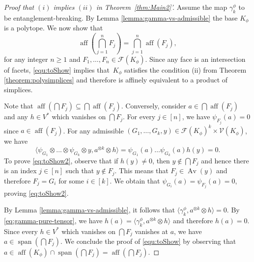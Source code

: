 \documentclass{amsart}
\renewcommand{\geq}{\geqslant}
\renewcommand{\subset}{\subseteq}
\DeclareMathOperator{\mathspan}{\mathrm{span}}
\DeclareMathOperator{\aff}{\mathrm{aff}}
\DeclareMathOperator{\Av}{Av}
\theoremstyle{plain}
\newcommand{\new}[1]{\textcolor{blue}{#1}}
\begin{document}
\begin{proof}[Proof that $(i)$ implies $(ii)$ in Theorem~\ref{thm:Main2}']
Assume the map $\gamma_k^\phi$ to be entanglement-breaking. 
By Lemma \ref{lemma:gamma-vs-admissible} the base $K_\phi$ is a polytope. We now show that
\begin{equation}\label{equ:toShow}
\aff \left( \bigcap_{j=1}^n F_j \right) = \bigcap_{j=1}^n \aff ( F_j),
\end{equation}
for any integer $n \geq 1$ and $F_1,\dots,F_n \in \mathcal{F}(K_\phi)$. Since any face is an intersection of facets, \eqref{equ:toShow} implies that~$K_\phi$ satisfies the condition (ii) from Theorem \ref{theorem:polysimplices} and therefore is affinely equivalent to a product of simplices.


Note that $\aff \left( \bigcap F_j \right) \subset \bigcap \aff ( F_j)$. Conversely, consider $a \in  \bigcap \aff(F_j)$ and any $h \in V^*$ which vanishes on $\bigcap F_j$. For every $j \in [n]$, we have $\psi_{F_j}(a)=0$ since $a \in \aff(F_j)$. For any admissible $(G_1,\dots,G_k,y) \in  \mathcal{F}(K_\phi)^k \times \mathcal{V}(K_\phi)$, we have
\begin{equation} \label{eq:toShow2} \langle \psi_{G_1} \otimes \dots \otimes \psi_{G_k} \otimes y, a^{\otimes k} \otimes h \rangle = \psi_{G_1}(a) \dots \psi_{G_k}(a) h(y) = 0. \end{equation}
To prove \eqref{eq:toShow2}, observe that if $h(y) \neq 0$, then $y \not \in \bigcap F_j$ and hence there is an index $j \in [n]$ such that $y \not \in F_j$. This means that $F_j \in \Av(y)$ and therefore $F_j = G_i$ for some $i \in [k]$. We obtain that $\psi_{G_i}(a)=\psi_{F_j}(a)=0$, proving \eqref{eq:toShow2}.

By Lemma \ref{lemma:gamma-vs-admissible}, it follows that $\langle \gamma_k^\phi, a^{\otimes k} \otimes h \rangle = 0$. By \eqref{eq:gamma-pure-tensor}, we have $h(a) = \langle \gamma_k^\phi, a^{\otimes k} \otimes h \rangle$ and therefore $h(a)=0$. Since every $h \in V^*$ which vanishes on $\bigcap F_j$ vanishes at $a$, we have $a \in \mathspan(\bigcap F_j)$. We conclude the proof of \eqref{equ:toShow} by observing that $a \in \aff(K_\phi) \cap \mathspan(\bigcap F_j) = \aff(\bigcap F_j)$.


\end{proof}
\end{document}
